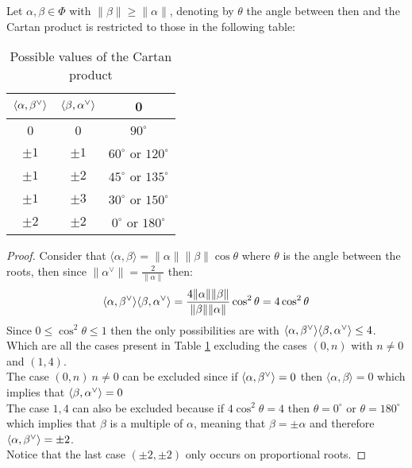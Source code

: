 \begin{prop}
	Let $\alpha,\beta \in \Phi$ with $\|\beta\|\ge \|\alpha\|$, denoting by $\theta$ the angle between then and the Cartan product is restricted to those in the following table:\\
	\begin{table}[ht]
		\caption{Possible values of the Cartan product}
		\begin{center}
				\begin{tabular}{|c|c|c|}
					\hline
					$\langle {\alpha},{\beta}^\lor\rangle$ & $\langle {\beta},{\alpha}^\lor\rangle$ & 0 \\
					\hline
					0 & 0 & $90^\circ$\\
					$\pm 1$ & $\pm 1$  & $60^\circ$ or $120^\circ$ \\
					$\pm 1$ & $\pm 2$  & $45^\circ$ or $135^\circ$\\
					$\pm 1$ & $\pm 3$  & $30^\circ$ or $150^\circ$ \\
					$\pm 2$ & $\pm 2$  & $0^\circ$ or $180^\circ$\\
					\hline
				\end{tabular}
		\end{center}
		\label{Cartan}
	\end{table}
\end{prop}
\begin{proof}
	Consider that $\langle \alpha,\beta \rangle = \|\alpha\|\|\beta\|\cos\theta$ where $\theta$ is the angle between the roots, then since $\|\alpha^\lor\| = \frac{2}{\|\alpha\|}$ then:
	$$ \langle {\alpha},{\beta}^\lor\rangle\langle {\beta},{\alpha}^\lor\rangle= \frac{4\|\alpha\|\|\beta\|}{\|\beta\|\|\alpha\|}\cos^2\theta = 4 \cos^2 \theta$$ 
	Since $0\le \cos^2\theta \le 1$  then the only possibilities are with $\langle {\alpha},{\beta}^\lor\rangle\langle {\beta},{\alpha}^\lor\rangle\le 4$.\\
	Which are all the cases present in Table \ref{Cartan} excluding the cases $(0,n)$ with $n\not=0$ and $(1,4)$. \\
	The case $(0,n)\  n\not=0$ can be excluded since if $\langle {\alpha},{\beta}^\lor\rangle=0$ then $\langle \alpha,\beta \rangle = 0$ which implies that $\langle {\beta},{\alpha}^\lor\rangle = 0$\\
	The case $1,4$ can also be excluded because if $4\cos^2 \theta = 4$ then $\theta = 0^\circ$ or $\theta = 180^\circ$ which implies that $\beta$ is a multiple of $\alpha$, meaning that $\beta = \pm \alpha$ and therefore $\langle {\alpha},{\beta}^\lor\rangle = \pm2$.\\
	Notice that the last case $(\pm 2,\pm 2)$ only occurs on proportional roots.
\end{proof}
